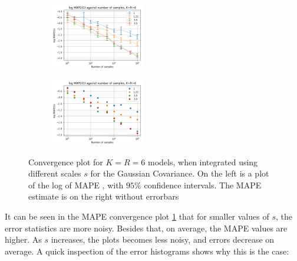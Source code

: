 \begin{figure}[!htb]
\begin{center}
\begin{subfigure}
    \centering
    \includegraphics[width=0.45\textwidth]{Chap6_EvaluationAndAnalysis/distribution_variation/Convergence_scale_KR6_gaussian.png}
\end{subfigure}
\begin{subfigure}
    \centering
    \includegraphics[width=0.45\textwidth]{Chap6_EvaluationAndAnalysis/distribution_variation/Convergence_scale_KR6_gaussian_meanerr.png}
\end{subfigure}
\caption{Convergence plot for \(K=R=6\) models, when integrated using different scales \(s\) for the Gaussian Covariance. On the left is a plot of the log of MAPE , with \(95\%\) confidence intervals. The MAPE estimate is on the right without errorbars}
\label{fig:ConvergencePlotGaussianScales}
\end{center}
\end{figure}

It can be seen in the MAPE convergence plot \ref{fig:ConvergencePlotGaussianScales} that for smaller values of \(s\), the error statistics are more noisy. Besides that, on average, the MAPE values are higher. As \(s\) increases, the plots becomes less noisy, and errors decrease on average. A quick inspection of the error histograms shows why this is the case:

